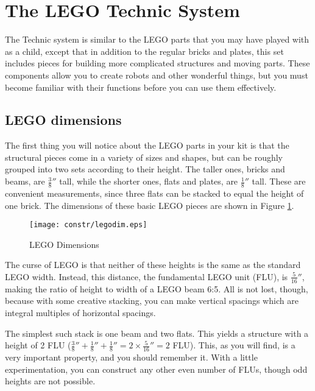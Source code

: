\section{The LEGO Technic System}

The Technic system is similar to the LEGO parts that you may have
played with as a child, except that in addition to the regular bricks
and plates, this set includes pieces for building more complicated
structures and moving parts.  These components allow you to create
robots and other wonderful things, but you must become familiar with
their functions before you can use them effectively.

\subsection{LEGO dimensions}

The first thing you will notice about the LEGO parts in your kit is
that the structural pieces come in a variety of sizes and shapes, but
can be roughly grouped into two sets according to their height.  The
taller ones, bricks and beams, are $\frac{3}{8}''$ tall, while the
shorter ones, flats and plates, are $\frac{1}{8}''$ tall.  These are
convenient measurements, since three flats can be stacked to equal the
height of one brick.  The dimensions of these basic LEGO pieces are
shown in Figure \ref{legodim}.

\begin{figure}[htbp]
\begin{center}
\texttt{[image: constr/legodim.eps]}
\caption{LEGO Dimensions}
\label{legodim}
\end{center}
\end{figure}

The curse of LEGO is that neither of these heights is the same as the
standard LEGO width.  Instead, this distance, the fundamental LEGO
unit (FLU), is $\frac{5}{16}''$, making the ratio of height to width
of a LEGO beam 6:5.  All is not lost, though, because with some
creative stacking, you can make vertical spacings which are integral
multiples of horizontal spacings.

The simplest such stack is one beam and two flats.  This yields a
structure with a height of 2 FLU ($\frac{3}{8}'' + \frac{1}{8}'' +
\frac{1}{8}'' = 2\times\frac{5}{16}'' = 2$ FLU).  This, as you will
find, is a very important property, and you should remember it.  With
a little experimentation, you can construct any other even number of
FLUs, though odd heights are not possible.

